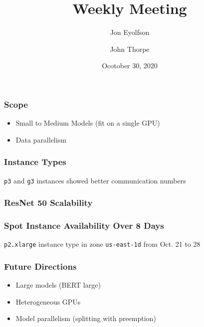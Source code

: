 

\title{Weekly Meeting}
\date{Ocotober 30, 2020}
\author{Jon Eyolfson \and John Thorpe}



  \begin{frame}[plain]
    \titlepage
  \end{frame}

  \setcounter{framenumber}{0}

  \begin{frame}
    \frametitle{Scope}

    \begin{itemize}
      \item Small to Medium Models (fit on a single GPU)
      \item Data parallelism
    \end{itemize}
  \end{frame}

  \begin{frame}
    \frametitle{Instance Types}

    \texttt{p3} and \texttt{g3} instances showed better communication numbers

  \end{frame}

  \begin{frame}
    \frametitle{ResNet 50 Scalability}

  \end{frame}

  \begin{frame}
    \frametitle{Spot Instance Availability Over 8 Days}

    \begin{center}
      
    \end{center}

    \texttt{p2.xlarge} instance type in zone \texttt{us-east-1d} from
    Oct. 21 to 28
  \end{frame}

  \begin{frame}
    \frametitle{Future Directions}

    \begin{itemize}
      \item Large models (BERT large)
      \item Heterogeneous GPUs
      \item Model parallelism (splitting with preemption)
    \end{itemize}
  \end{frame}


